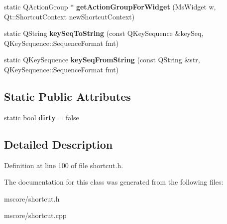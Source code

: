 \begin{DoxyCompactItemize}
static Q\+Action\+Group $\ast$ {\bfseries get\+Action\+Group\+For\+Widget} (Ms\+Widget w, Qt\+::\+Shortcut\+Context new\+Shortcut\+Context)
\item 
\mbox{\label{class_ms_1_1_shortcut_a530d626310ce0f7dd9d1c5a40e8ba844}} 
static Q\+String {\bfseries key\+Seq\+To\+String} (const Q\+Key\+Sequence \&key\+Seq, Q\+Key\+Sequence\+::\+Sequence\+Format fmt)
\item 
\mbox{\label{class_ms_1_1_shortcut_afe8559f810c10944a40cabe73244da2b}} 
static Q\+Key\+Sequence {\bfseries key\+Seq\+From\+String} (const Q\+String \&str, Q\+Key\+Sequence\+::\+Sequence\+Format fmt)
\end{DoxyCompactItemize}
\subsection*{Static Public Attributes}
\begin{DoxyCompactItemize}
\item 
\mbox{\label{class_ms_1_1_shortcut_a1fe029ce2a539182c9cc94aadfdc7ed8}} 
static bool {\bfseries dirty} = false
\end{DoxyCompactItemize}


\subsection{Detailed Description}


Definition at line 100 of file shortcut.\+h.



The documentation for this class was generated from the following files\+:\begin{DoxyCompactItemize}
\item 
mscore/shortcut.\+h\item 
mscore/shortcut.\+cpp\end{DoxyCompactItemize}

